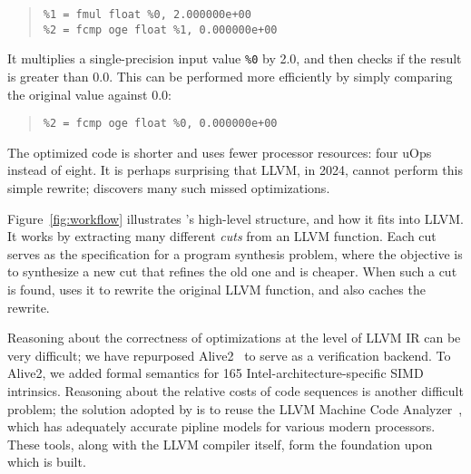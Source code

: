 {\small\begin{quote}
\begin{verbatim}
%1 = fmul float %0, 2.000000e+00
%2 = fcmp oge float %1, 0.000000e+00
\end{verbatim}
\end{quote}}

It multiplies a single-precision input value \texttt{\%0} by 2.0, and
then checks if the result is greater than 0.0.
%
This can be performed more efficiently by simply comparing the
original value against 0.0:

{\small\begin{quote}
\begin{verbatim}
%2 = fcmp oge float %0, 0.000000e+00
\end{verbatim}
\end{quote}}

The optimized code is shorter and uses fewer processor resources: four
uOps instead of eight.
%
It is perhaps surprising that LLVM, in 2024, cannot perform this
simple rewrite; \minotaur{} discovers many such missed optimizations.



Figure~\ref{fig:workflow} illustrates \minotaur's high-level structure,
and how it fits into LLVM\@.
%
It works by extracting many different \textit{cuts} from an LLVM function.
%
Each cut serves as the specification for a program synthesis
problem, where the objective is to synthesize a new cut that refines
the old one and is cheaper.
%
When such a cut is found, \minotaur{} uses it to rewrite the original
LLVM function, and also caches the rewrite.


Reasoning about the correctness of optimizations at the level of LLVM
IR can be very difficult; we have repurposed Alive2~\cite{alive2} to
serve as a verification backend.
%
To Alive2, we added formal semantics for 165
Intel-architecture-specific SIMD intrinsics.
%
Reasoning about the relative costs of code sequences is another
difficult problem; the solution adopted by \minotaur{} is to reuse the
LLVM Machine Code Analyzer~\cite{llvmmca}, which has adequately
accurate pipline models for various modern processors.
%
These tools, along with the LLVM compiler itself, form the
foundation upon which \minotaur{} is built.


